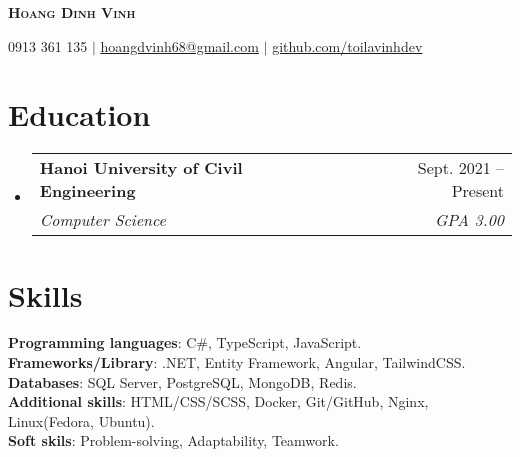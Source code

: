 \documentclass[letterpaper,11pt]{article}
\makeatletter
\newcommand{\resumeSubheading}[4]{
  \vspace{-2pt}
  \item
    \begin{tabular*}{0.97\textwidth}[t]{l@{\extracolsep{\fill}}r}
      \textbf{#1} & #2 \\
      \textit{\small#3} & \textit{\small #4} \\
    \end{tabular*}
    \vspace{-7pt}
}
\newcommand{\resumeSubHeadingListStart} {
    \begin{itemize}[leftmargin=0.15in, label={}]
}
\newcommand{\resumeSubHeadingListEnd} {
    \end{itemize}
}
\makeatother
\begin{document}
    \begin{center}
        \textbf{\Huge \scshape Hoang Dinh Vinh}
    \end{center}
    
    \begin{center}
        \small 0913 361 135 
        $|$
        \href{mailto:hoangdvinh68@gmail.com}{\underline{hoangdvinh68@gmail.com}} 
        $|$
        \href{https://github.com/toilavinhdev}{\underline{github.com/toilavinhdev}} 
    \end{center}


    \section{Education}
        \resumeSubHeadingListStart
            \resumeSubheading {Hanoi University of Civil Engineering} {Sept. 2021 -- Present} {Computer Science} {GPA 3.00}
        \resumeSubHeadingListEnd

    \section{Skills}
        \begin{itemize}[leftmargin=0.15in, label={}]
            \small{
                \item{
                    \vspace{1mm}
                    \textbf{Programming languages}{: C\#, TypeScript, JavaScript.} \\
                    \vspace{1mm}
                    \textbf{Frameworks/Library}{: .NET, Entity Framework, Angular, TailwindCSS.} \\
                    \vspace{1mm}
                    \textbf{Databases}{: SQL Server, PostgreSQL, MongoDB, Redis.} \\
                    \vspace{1mm}
                    \textbf{Additional skills}{: HTML/CSS/SCSS, Docker, Git/GitHub, Nginx, Linux(Fedora, Ubuntu).} \\
                    \vspace{1mm}
                    \textbf{Soft skils}{: Problem-solving, Adaptability, Teamwork.} \\
                    \vspace{1mm}
                }
            }
        \end{itemize}
\end{document}

